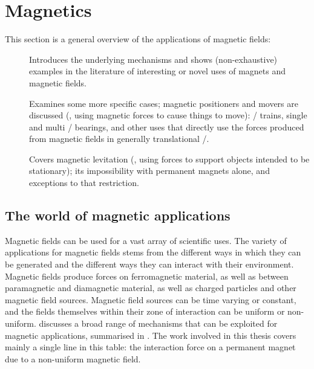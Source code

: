 \documentclass[11pt,a4paper]{memoir}
\begin{document}
\section{Magnetics}


This section is a general overview of the applications of magnetic fields:
\begin{description}
\item[]
Introduces the underlying mechanisms and shows (non-exhaustive) examples in the literature of interesting or novel uses of magnets and magnetic fields.
\item[]
Examines some more specific cases; magnetic positioners and movers are discussed (\ie, using magnetic forces to cause things to move): \maglev/ trains, single and multi \dof/ bearings, and other uses that directly use the forces produced from magnetic fields in generally translational \dofs/.
\item[] Covers magnetic levitation (\ie, using forces to support objects intended to be stationary); its impossibility with permanent magnets alone, and exceptions to that restriction.
\end{description}



\subsection{The world of magnetic applications}

Magnetic fields can be used for a vast array of scientific uses.
The variety of applications for magnetic fields stems from the different ways in which they can be generated and the different ways they can interact with their environment.
Magnetic fields produce forces on ferromagnetic material, as well as between paramagnetic and diamagnetic material, as well as charged particles and other magnetic field sources. Magnetic field sources can be time varying or constant, and the fields themselves within their zone of interaction can be uniform or non-uniform.
\textcite{coey2002} discusses a broad range of mechanisms that can be exploited for magnetic applications, summarised in .
The work involved in this thesis covers mainly a single line in this table: the interaction force on a permanent magnet due to a non-uniform magnetic field.
\end{document}
